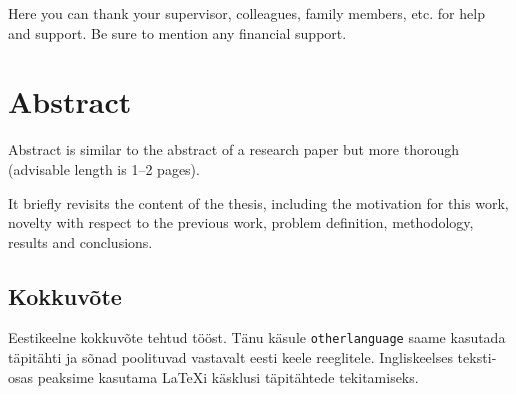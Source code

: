 Here you can thank your supervisor, colleagues, family members, etc. for help and support. Be sure to mention any financial support.




\section*{Abstract \\ \ThesisTitleENG}
Abstract is similar to the abstract of a research paper but more thorough (advisable length is 1--2 pages).

It briefly revisits the content of the thesis, including the motivation for this work, novelty with respect to the previous work, problem definition, methodology, results and conclusions.



\begin{otherlanguage}{estonian}
\section*{Kokkuvõte\\ \ThesisTitleEST }
Eestikeelne kokkuvõte tehtud tööst. Tänu käsule \texttt{otherlanguage} saame kasutada täpitähti ja sõnad poolituvad vastavalt eesti keele reeglitele. Ingliskeelses tekstiosas peaksime kasutama LaTeXi käsklusi täpitähtede tekitamiseks. 
\end{otherlanguage}





\FloatBarrier %


